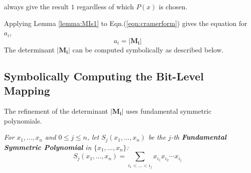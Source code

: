 \begin{Example}
{always give the result $1$ regardless of which $P(x)$ is chosen.
}
%
\end{Example}

Applying Lemma \ref{lemma:MIs1} to Eqn.(\ref{eqn:cramerform}) gives the 
equation for $a_i$,
\begin{equation}
a_i = |\mathbf{M_i}|
\end{equation}
The determinant $|\mathbf{M_i}|$ can be computed symbolically as described below.

%


\subsection{Symbolically Computing the Bit-Level Mapping}
The refinement of the determinant $|\mathbf{M_i}|$ uses fundamental
symmetric polynomials.

\begin{Definition}
{\it For $x_1, \dots, x_n$ and $0 \leq j \leq n$, let $S_j(x_1, \dots, x_n )$ be the $j$-th 
{\bf Fundamental Symmetric Polynomial} in $\{x_1, \dots, x_n\}$:
\begin{equation}
S_j(x_1,\dots,x_n) = \sum\limits_{i_1 < \dots < i_j}x_{i_1}x_{i_2}\cdots x_{i_j}
\end{equation}
}
\end{Definition}

